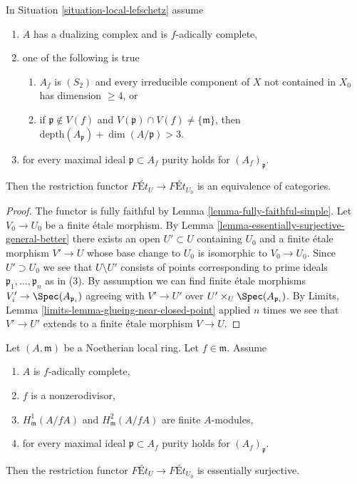\begin{lemma}
\label{lemma-equivalence-better}
In Situation \ref{situation-local-lefschetz} assume
\begin{enumerate}
\item $A$ has a dualizing complex and is $f$-adically complete,
\item one of the following is true
\begin{enumerate}
\item $A_f$ is $(S_2)$ and every irreducible component of $X$
not contained in $X_0$ has dimension $\geq 4$, or
\item if $\mathfrak p \not \in V(f)$ and
$V(\mathfrak p) \cap V(f) \not = \{\mathfrak m\}$, then
$\text{depth}(A_\mathfrak p) + \dim(A/\mathfrak p) > 3$.
\end{enumerate}
\item for every maximal ideal $\mathfrak p \subset A_f$
purity holds for $(A_f)_\mathfrak p$.
\end{enumerate}
Then the restriction functor $\textit{F\'Et}_U \to \textit{F\'Et}_{U_0}$
is an equivalence of categories.
\end{lemma}

\begin{proof}
The functor is fully faithful by Lemma \ref{lemma-fully-faithful-simple}.
Let $V_0 \to U_0$ be a finite \'etale morphism. By
Lemma \ref{lemma-essentially-surjective-general-better}
there exists an open $U' \subset U$ containing $U_0$ and
a finite \'etale morphism $V' \to U$ whose base change to $U_0$
is isomorphic to $V_0 \to U_0$. Since $U' \supset U_0$
we see that $U \setminus U'$ consists of points corresponding
to prime ideals $\mathfrak p_1, \ldots, \mathfrak p_n$ as in (3).
By assumption we can find finite \'etale morphisms
$V'_i \to \Spec(A_{\mathfrak p_i})$ agreeing with
$V' \to U'$ over $U' \times_U \Spec(A_{\mathfrak p_i})$.
By Limits, Lemma \ref{limits-lemma-glueing-near-closed-point}
applied $n$ times we see that $V' \to U'$ extends to a finite \'etale
morphism $V \to U$.
\end{proof}

\begin{lemma}
\label{lemma-equivalence}
Let $(A, \mathfrak m)$ be a Noetherian local ring.
Let $f \in \mathfrak m$. Assume
\begin{enumerate}
\item $A$ is $f$-adically complete,
\item $f$ is a nonzerodivisor,
\item $H^1_\mathfrak m(A/fA)$ and $H^2_\mathfrak m(A/fA)$ are finite
$A$-modules,
\item for every maximal ideal $\mathfrak p \subset A_f$
purity holds for $(A_f)_\mathfrak p$.
\end{enumerate}
Then the restriction functor $\textit{F\'Et}_U \to \textit{F\'Et}_{U_0}$
is essentially surjective.
\end{lemma}

